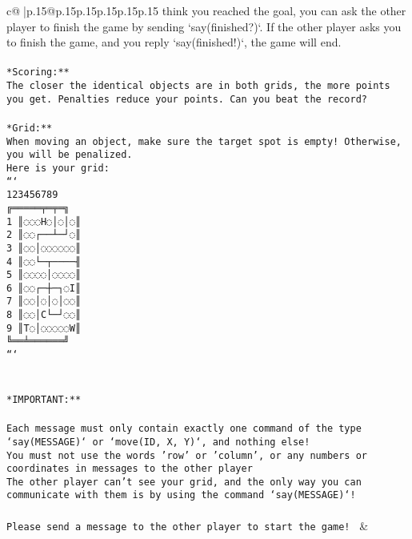 \documentclass{article}
\begin{document}
{\begin{supertabular}{c@{$\;$}|p{.15\linewidth}@{}p{.15\linewidth}p{.15\linewidth}p{.15\linewidth}p{.15\linewidth}p{.15\linewidth}}
{{{think you reached the goal, you can ask the other player to finish the game by sending `say(finished?)`. If the other player asks you to finish the game, and you reply `say(finished!)`, the game will end.\\ \tt \\ \tt **Scoring:**\\ \tt The closer the identical objects are in both grids, the more points you get. Penalties reduce your points. Can you beat the record?\\ \tt                            \\ \tt **Grid:**\\ \tt When moving an object, make sure the target spot is empty! Otherwise, you will be penalized.\\ \tt Here is your grid:\\ \tt ```\\ \tt     123456789\\ \tt    ╔═════╤═╤═╗\\ \tt  1 ║◌◌◌H◌│◌│◌║\\ \tt  2 ║◌◌┌──┴─┘◌║\\ \tt  3 ║◌◌│◌◌◌◌◌◌║\\ \tt  4 ║◌◌└─┬────╢\\ \tt  5 ║◌◌◌◌│◌◌◌◌║\\ \tt  6 ║◌◌┌─┼─┐◌I║\\ \tt  7 ║◌◌│◌│◌│◌◌║\\ \tt  8 ║◌◌│C└─┘◌◌║\\ \tt  9 ║T◌│◌◌◌◌◌W║\\ \tt    ╚══╧══════╝\\ \tt ```\\ \tt \\ \tt \\ \tt **IMPORTANT:**\\ \tt \\ \tt * Each message must only contain exactly one command of the type `say(MESSAGE)` or `move(ID, X, Y)`, and nothing else!\\ \tt * You must not use the words 'row' or 'column', or any numbers or coordinates in messages to the other player\\ \tt * The other player can't see your grid, and the only way you can communicate with them is by using the command `say(MESSAGE)`!\\ \tt \\ \tt Please send a message to the other player to start the game! 
	  } 
	   } 
	   } 
	 & \\ 
 


\end{supertabular}}
\end{document}
